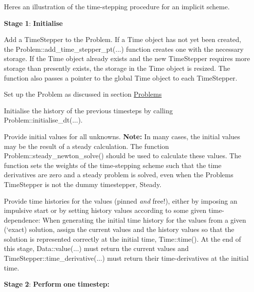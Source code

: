 Here\textquotesingle{}s an illustration of the time-\/stepping procedure for an implicit scheme.
\begin{DoxyItemize}
\item {\bfseries Stage} {\bfseries 1}\+: {\bfseries Initialise} 
\begin{DoxyEnumerate}
\item Add a {\ttfamily Time\+Stepper} to the {\ttfamily Problem}. If a {\ttfamily Time} object has not yet been created, the {\ttfamily Problem\+::add\+\_\+time\+\_\+stepper\+\_\+pt}(...) function creates one with the necessary storage. If the {\ttfamily Time} object already exists and the new {\ttfamily Time\+Stepper} requires more storage than presently exists, the storage in the {\ttfamily Time} object is resized. The function also passes a pointer to the global {\ttfamily Time} object to each {\ttfamily Time\+Stepper}.
\item Set up the {\ttfamily Problem} as discussed in section \hyperlink{index_problems}{Problems}
\item Initialise the history of the previous timesteps by calling {\ttfamily Problem\+::initialise\+\_\+dt}(...).
\item Provide initial values for all unknowns. {\bfseries Note\+:} In many cases, the initial values may be the result of a steady calculation. The function {\ttfamily Problem\+::steady\+\_\+newton\+\_\+solve()} should be used to calculate these values. The function sets the weights of the time-\/stepping scheme such that the time derivatives are zero and a steady problem is solved, even when the {\ttfamily Problem\textquotesingle{}s} {\ttfamily Time\+Stepper} is not the dummy timestepper, {\ttfamily Steady}.
\item Provide time histories for the values (pinned {\itshape and} free!), either by imposing an impulsive start or by setting history values according to some given time-\/dependence\+: When generating the initial time history for the values from a given (`exact\textquotesingle{}) solution, assign the current values and the history values so that the solution is represented correctly at the initial time, {\ttfamily Time\+::time()}. At the end of this stage, {\ttfamily Data\+::value}(...) must return the current values and {\ttfamily Time\+Stepper\+::time\+\_\+derivative}(...) must return their time-\/derivatives at the initial time.
\end{DoxyEnumerate}
\item {\bfseries Stage} {\bfseries 2}\+: {\bfseries Perform} {\bfseries one} {\bfseries timestep\+:} ~\newline

\end{DoxyItemize}

